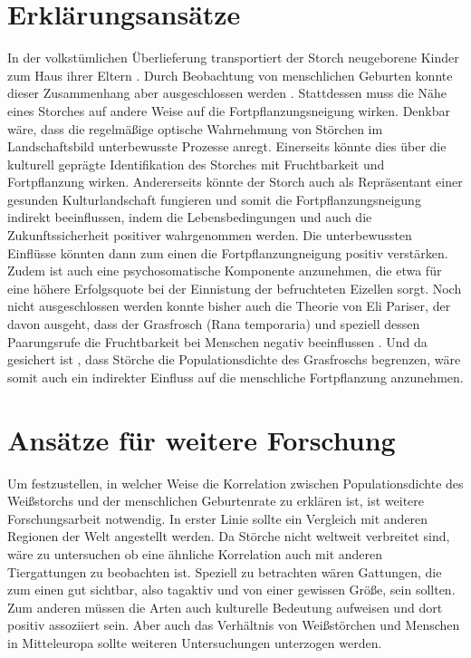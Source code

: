 \documentclass{article}
\begin{document}
\section{Erklärungsansätze}

In der volkstümlichen Überlieferung transportiert der Storch neugeborene Kinder zum Haus ihrer Eltern \autocite[98f]{van_der_heijden_sedya:_2013}.
Durch Beobachtung von menschlichen Geburten konnte dieser Zusammenhang aber ausgeschlossen werden \autocite[3ff]{stopfer_personlichkeit_2010}.
Stattdessen muss die Nähe eines Storches auf andere Weise auf die Fortpflanzungsneigung wirken.
Denkbar wäre, dass die regelmäßige optische Wahrnehmung von Störchen im Landschaftsbild unterbewusste Prozesse anregt.
Einerseits könnte dies über die kulturell geprägte Identifikation des Storches mit Fruchtbarkeit und Fortpflanzung wirken.
Andererseits könnte der Storch auch als Repräsentant einer gesunden Kulturlandschaft fungieren und somit die Fortpflanzungsneigung indirekt beeinflussen,
indem die Lebensbedingungen und auch die Zukunftssicherheit positiver wahrgenommen werden.
Die unterbewussten Einflüsse könnten dann zum einen die Fortpflanzungneigung positiv verstärken.
Zudem ist auch eine psychosomatische Komponente anzunehmen, die etwa für eine höhere Erfolgsquote bei der Einnistung der befruchteten Eizellen sorgt.
Noch nicht ausgeschlossen werden konnte bisher auch die Theorie von Eli Pariser,
der davon ausgeht, dass der Grasfrosch (Rana temporaria) und speziell dessen Paarungsrufe die Fruchtbarkeit bei Menschen negativ beeinflussen \autocite[11f]{ted_eli_2011}.
Und da gesichert ist \autocite[666]{shapiro_information_2007}, dass Störche die Populationsdichte des Grasfroschs begrenzen, wäre somit auch ein indirekter Einfluss auf die menschliche Fortpflanzung anzunehmen.

\section{Ansätze für weitere Forschung}

Um festzustellen, in welcher Weise die Korrelation zwischen Populationsdichte des Weißstorchs und der menschlichen Geburtenrate zu erklären ist, ist weitere Forschungsarbeit notwendig.
In erster Linie sollte ein Vergleich mit anderen Regionen der Welt angestellt werden. Da Störche nicht weltweit verbreitet sind, wäre zu untersuchen ob eine ähnliche Korrelation auch mit anderen Tiergattungen zu beobachten ist.
Speziell zu betrachten wären Gattungen, die zum einen gut sichtbar, also tagaktiv und von einer gewissen Größe, sein sollten. Zum anderen müssen die Arten auch kulturelle Bedeutung aufweisen und dort positiv assoziiert sein.
Aber auch das Verhältnis von Weißstörchen und Menschen in Mitteleuropa sollte weiteren Untersuchungen unterzogen werden.
\end{document}
